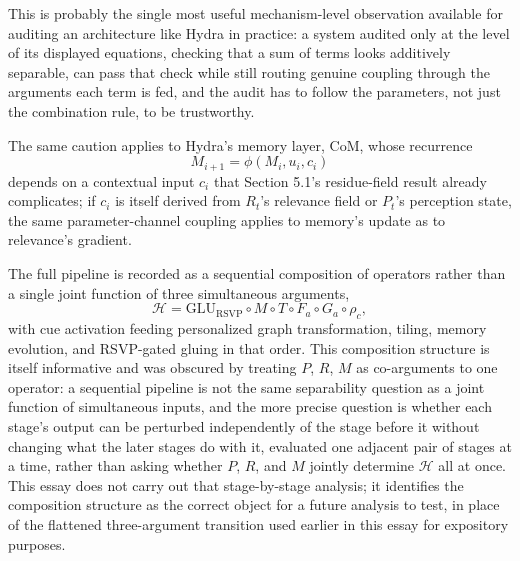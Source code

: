 \documentclass[11pt]{article}
\begin{document}
This is probably the single most useful mechanism-level observation available for auditing an architecture like Hydra in practice: a system audited only at the level of its displayed equations, checking that a sum of terms looks additively separable, can pass that check while still routing genuine coupling through the arguments each term is fed, and the audit has to follow the parameters, not just the combination rule, to be trustworthy.

The same caution applies to Hydra's memory layer, CoM, whose recurrence
\[
M_{i+1} = \phi(M_i, u_i, c_i)
\]
depends on a contextual input $c_i$ that Section 5.1's residue-field result already complicates; if $c_i$ is itself derived from $R_t$'s relevance field or $P_t$'s perception state, the same parameter-channel coupling applies to memory's update as to relevance's gradient.

The full pipeline is recorded as a sequential composition of operators rather than a single joint function of three simultaneous arguments,
\[
\mathcal{H} = \mathrm{GLU}_{\mathrm{RSVP}} \circ M \circ T \circ F_a \circ G_a \circ \rho_c,
\]
with cue activation feeding personalized graph transformation, tiling, memory evolution, and RSVP-gated gluing in that order. This composition structure is itself informative and was obscured by treating $P$, $R$, $M$ as co-arguments to one operator: a sequential pipeline is not the same separability question as a joint function of simultaneous inputs, and the more precise question is whether each stage's output can be perturbed independently of the stage before it without changing what the later stages do with it, evaluated one adjacent pair of stages at a time, rather than asking whether $P$, $R$, and $M$ jointly determine $\mathcal{H}$ all at once. This essay does not carry out that stage-by-stage analysis; it identifies the composition structure as the correct object for a future analysis to test, in place of the flattened three-argument transition used earlier in this essay for expository purposes.
\end{document}
